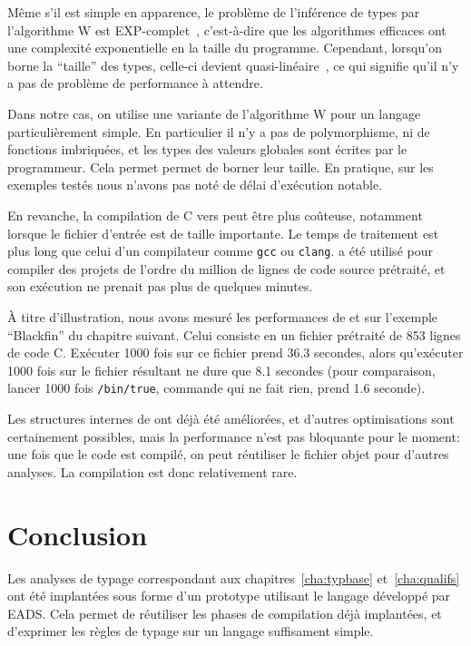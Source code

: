 
Même s'il est simple en apparence, le problème de l'inférence de types par
l'algorithme W est EXP-complet~\cite{mairson}, c'est-à-dire que les algorithmes
efficaces ont une complexité exponentielle en la taille du programme. Cependant,
lorsqu'on borne la \enquote{taille} des types, celle-ci devient
quasi-linéaire~\cite{rta03}, ce qui signifie qu'il n'y a pas de problème de
performance à attendre.

Dans notre cas, on utilise une variante de l'algorithme W pour un langage
particulièrement simple. En particulier il n'y a pas de polymorphisme, ni de
fonctions imbriquées, et les types des valeurs globales sont écrites par le
programmeur. Cela permet permet de borner leur taille. En pratique, sur les
exemples testés nous n'avons pas noté de délai d'exécution notable.

En revanche, la compilation de C vers \newspeak peut être plus coûteuse,
notamment lorsque le fichier d'entrée est de taille importante. Le temps de
traitement est plus long que celui d'un compilateur comme \texttt{gcc} ou
\texttt{clang}. \ctonewspeak a été utilisé pour compiler des projets de l'ordre
du million de lignes de code source prétraité, et son exécution ne prenait pas
plus de quelques minutes.

À titre d'illustration, nous avons mesuré les performances de \ctonewspeak et
\ptrtype sur l'exemple \enquote{Blackfin} du chapitre suivant. Celui consiste en
un fichier prétraité de 853 lignes de code C. Exécuter 1000 fois \ctonewspeak
sur ce fichier prend 36.3 secondes, alors qu'exécuter 1000 fois \ptrtype sur le
fichier \newspeak résultant ne dure que 8.1 secondes (pour comparaison, lancer
1000 fois \texttt{/bin/true}, commande qui ne fait rien, prend 1.6 seconde).

Les structures internes de \ctonewspeak ont déjà été améliorées, et d'autres
optimisations sont certainement possibles, mais la performance n'est pas
bloquante pour le moment: une fois que le code est compilé, on peut réutiliser
le fichier objet \newspeak pour d'autres analyses. La compilation est donc
relativement rare.

\section*{Conclusion}

Les analyses de typage correspondant aux chapitres~\ref{cha:typbase}
et~\ref{cha:qualifs} ont été implantées sous forme d'un prototype utilisant le
langage \newspeak développé par EADS. Cela permet de réutiliser les phases de
compilation déjà implantées, et d'exprimer les règles de typage sur un langage
suffisament simple.

